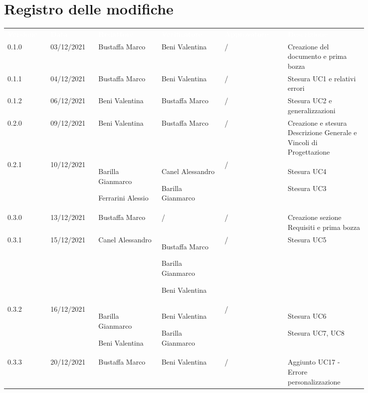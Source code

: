 \section*{Registro delle modifiche}

{\renewcommand{\arraystretch}{1.5}
\scriptsize
\begin{tabular}{p{0.10\linewidth}p{0.10\linewidth}p{0.15\linewidth}p{0.15\linewidth}p{0.15\linewidth}p{0.19\linewidth}}
	\rowcolor[RGB]{33, 73, 50}
	\textcolor{white}{\textbf{Versione}} & \textcolor{white}{\textbf{Data}} &
	\textcolor{white}{\textbf{Redattore}} & \textcolor{white}{\textbf{Verificatore}} &
	\textcolor{white}{\textbf{Approvatore}} & \textcolor{white}{\textbf{Descrizione}}\\
	\rowcolor[RGB]{216, 235, 171}
	0.1.0 & 03/12/2021 & Bustaffa Marco& Beni Valentina &/& Creazione del documento e prima bozza\\
	\rowcolor[RGB]{233, 245, 206}
	0.1.1 & 04/12/2021 & Bustaffa Marco& Beni Valentina &/& Stesura UC1 e relativi errori\\
	\rowcolor[RGB]{216, 235, 171}
	0.1.2 & 06/12/2021 & Beni Valentina& Bustaffa Marco &/& Stesura UC2 e generalizzazioni\\
	\rowcolor[RGB]{233, 245, 206}
	0.2.0 & 09/12/2021 & Beni Valentina& Bustaffa Marco &/& Creazione e stesura Descrizione Generale e Vincoli di Progettazione\\
	\rowcolor[RGB]{216, 235, 171}
	0.2.1 & 10/12/2021 & Barilla Gianmarco \par Ferrarini Alessio& Canel Alessandro \par Barilla Gianmarco &/& Stesura UC4 \par Stesura UC3 \\
	\rowcolor[RGB]{233, 245, 206}
	0.3.0 & 13/12/2021 & Bustaffa Marco& / &/& Creazione sezione Requisiti e prima bozza\\
	\rowcolor[RGB]{216, 235, 171}
	0.3.1 & 15/12/2021 & Canel Alessandro& Bustaffa Marco \par Barilla Gianmarco \par Beni Valentina&/& Stesura UC5\\
	\rowcolor[RGB]{233, 245, 206}
	0.3.2 & 16/12/2021 & Barilla Gianmarco \par Beni Valentina& Beni Valentina \par Barilla Gianmarco &/& Stesura UC6 \par Stesura UC7, UC8\\
	\rowcolor[RGB]{216, 235, 171}
	0.3.3 & 20/12/2021 & Bustaffa Marco& Beni Valentina &/& Aggiunto UC17 - Errore personalizzazione\\

\end{tabular}}
